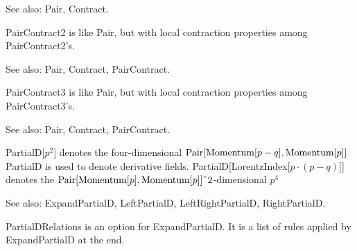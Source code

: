 See also: Pair, Contract.



PairContract2 is like Pair, but with local contraction properties among PairContract2's.

See also: Pair, Contract, PairContract.



PairContract3 is like Pair, but with local contraction properties among PairContract3's.

See also: Pair, Contract, PairContract.



PartialD[\({p^2}\)] denotes the four-dimensional \(\mathrm{Pair}[\mathrm{Momentum}[p-q],\mathrm{Momentum}[p]]\) PartialD is
used to denote derivative fields. PartialD[LorentzIndex[\(p\cdot (p-q)\)]] denotes the \(\Muserfunction{Pair}[\Muserfunction{Momentum}[p],\Muserfunction{Momentum}[p]]\RawWedge
2\)-dimensional \({p^4}\)

See also:  ExpandPartialD, LeftPartialD, LeftRightPartialD, RightPartialD.










PartialDRelations is an option for ExpandPartialD. It is a list of rules applied by ExpandPartialD at the end.

